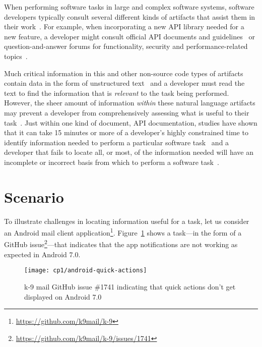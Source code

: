 

When performing software tasks in large and complex software systems, software developers typically consult several different kinds of artifacts that assist them in their work~\cite{Starke2009, Meyer2017}. For example, 
when incorporating a new API library needed for a new feature, a developer might consult official API documents and guidelines~\cite{robillard2011field, umarji2008archetypal} or 
 question-and-answer forums for functionality, security and performance-related topics~\cite{parnin2012, silva2019}.



Much critical information in this and other non-source code types of artifacts 
contain data in the form of unstructured text~\cite{Bavota2016} and 
a developer must read the text to find the information that is \textit{relevant} to the task being performed.
However, the sheer amount of information \textit{within} these natural language artifacts may prevent a developer from comprehensively assessing what is useful to their task~\cite{Murphy2005}. Just within one kind of document, API
documentation, studies have shown that it can take 15 minutes or more
of a developer's highly constrained time to identify 
information needed to perform a particular software task~\cite{endrikat2014, Meyer2017}
and a developer that fails to locate all, or most, of the information needed
 will have an incomplete or incorrect basis from which to perform a software task~\cite{Murphy2005}.



 \section{Scenario}
 \label{cp1:example}
 
 
 
 
 To illustrate challenges in locating information useful for a task, let us consider an  Android mail client application\footnote{\url{https://github.com/k9mail/k-9}}.
 Figure~\ref{fig:android-notifications-task} shows a task---in the form of a GitHub issue\footnote{\url{https://github.com/k9mail/k-9/issues/1741}}---that indicates that the app notifications 
 are not working as expected in Android 7.0. 
 
 \medskip
 \begin{figure}[h!]
     \centering
     \texttt{[image: cp1/android-quick-actions]}
     \caption{k-9 mail GitHub issue \#1741 indicating that quick actions don't get displayed on Android 7.0}
     \label{fig:android-notifications-task}
 \end{figure}
 
